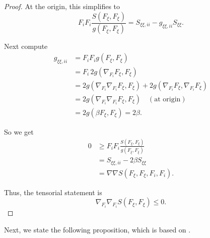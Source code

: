 \documentclass[12pt,letterpaper]{amsart}%
\numberwithin{mycounter}{section}
\theoremstyle{plain}
\numberwithin{equation}{section}
\theoremstyle{definition}
\newcommand{\maxidx}{\mathord{\xi}} %
\begin{document}
\begin{proof}
At the origin, this simplifies to
\[
F_{i}F_{i}\frac{S(F_{\maxidx},F_{\maxidx})}{g(F_{\maxidx},F_{\maxidx})}
= S_{\maxidx\maxidx,ii} - g_{\maxidx\maxidx,ii} S_{\maxidx\maxidx}.
\]

Next compute
\begin{align*}
g_{\maxidx\maxidx,ii}
&= F_{i}F_{i} g(F_{\maxidx},F_{\maxidx})\\
&= F_{i}\, 2g(\nabla_{F_{i}}F_{\maxidx},F_{\maxidx})\\
&= 2g(\nabla_{F_{i}}\nabla_{F_{i}}F_{\maxidx},F_{\maxidx})
  +2g(\nabla_{F_{i}}F_{\maxidx},\nabla_{F_{i}}F_{\maxidx})\\
&= 2g(\nabla_{F_{i}}\nabla_{F_{i}}F_{\maxidx},F_{\maxidx})
   \quad (\text{at origin})\\
&= 2g(\beta F_{\maxidx},F_{\maxidx})
 = 2\beta.
\end{align*}

So we get
\begin{align*}
0
&\ge F_{i}F_{i}\frac{S(F_{\maxidx},F_{\maxidx})}{g(F_{\maxidx},F_{\maxidx})} \\
&= S_{\maxidx\maxidx,ii} - 2\beta S_{\maxidx\maxidx}\\
&= \nabla\nabla S(F_{\maxidx},F_{\maxidx},F_{i},F_{i}).
\end{align*}

Thus, the tensorial statement is
\[
\nabla_{F_i}\nabla_{F_i}S(F_{\maxidx},F_{\maxidx})\leq0.
\]
\end{proof}

Next, we state the following proposition, which is based on \cite[Proposition 1]{BLMR}.
\end{document}
